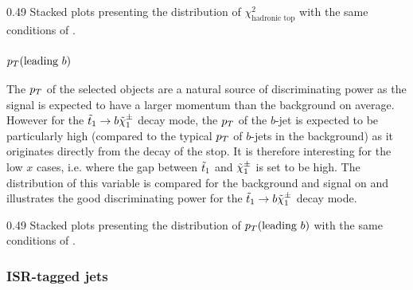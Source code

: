                      {0.49}
                     {Stacked plots presenting the distribution of $\chi^2_\text{hadronic top}$
                     with the same conditions of .}

        \subsubsection{$p_T(\text{leading } b)$}

        The $p_T$ of the selected objects are a natural source of discriminating power as
        the signal is expected to have a larger momentum than the background on average.
        However for the $\tilde{t}_1 \rightarrow b \tilde{\chi}_1^\pm$ decay mode, the $p_T$ of the
        $b$-jet is expected to be particularly high (compared to the typical $p_T$ of $b$-jets in the
        background) as it originates directly from the decay of the stop. It is therefore
        interesting for the low $x$ cases, i.e. where the gap between $\tilde{t}_1$ and
        $\tilde{\chi}_1^\pm$ is set to be high. The distribution of this variable is compared for
        the background and signal on  and illustrates the
        good discriminating power for the $\tilde{t}_1 \rightarrow b \tilde{\chi}_1^\pm$ decay mode.

                     {0.49}
                     {Stacked plots presenting the distribution of $p_T(\text{leading } b)$
                     with the same conditions of .}

        \subsubsection{ISR-tagged jets}

